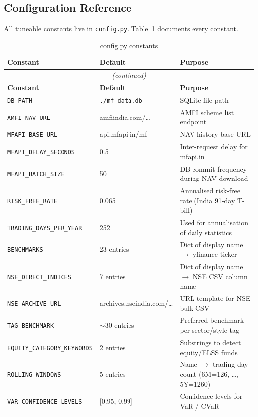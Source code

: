 \documentclass[12pt, a4paper]{article}
\begin{document}
\subsection{Configuration Reference}

All tuneable constants live in \texttt{config.py}.
Table~\ref{tab:config} documents every constant.

\begin{longtable}{@{}p{}p{}p{}@{}}
\caption{config.py constants}\label{tab:config}\\
\toprule
\textbf{Constant} & \textbf{Default} & \textbf{Purpose} \\
\midrule
\endfirsthead
\multicolumn{3}{c}{\textit{(continued)}}\\
\toprule
\textbf{Constant} & \textbf{Default} & \textbf{Purpose} \\
\midrule
\endhead
\texttt{DB\_PATH} & \texttt{./mf\_data.db} & SQLite file path \\[3pt]
\texttt{AMFI\_NAV\_URL} & amfiindia.com/\ldots & AMFI scheme list endpoint \\[3pt]
\texttt{MFAPI\_BASE\_URL} & api.mfapi.in/mf & NAV history base URL \\[3pt]
\texttt{MFAPI\_DELAY\_SECONDS} & 0.5 & Inter-request delay for mfapi.in \\[3pt]
\texttt{MFAPI\_BATCH\_SIZE} & 50 & DB commit frequency during NAV download \\[3pt]
\texttt{RISK\_FREE\_RATE} & 0.065 & Annualised risk-free rate (India 91-day T-bill) \\[3pt]
\texttt{TRADING\_DAYS\_PER\_YEAR} & 252 & Used for annualisation of daily statistics \\[3pt]
\texttt{BENCHMARKS} & 23 entries & Dict of display name $\to$ yfinance ticker \\[3pt]
\texttt{NSE\_DIRECT\_INDICES} & 7 entries & Dict of display name $\to$ NSE CSV column name \\[3pt]
\texttt{NSE\_ARCHIVE\_URL} & archives.nseindia.com/\ldots & URL template for NSE bulk CSV \\[3pt]
\texttt{TAG\_BENCHMARK} & $\sim$30 entries & Preferred benchmark per sector/style tag \\[3pt]
\texttt{EQUITY\_CATEGORY\_KEYWORDS} & 2 entries & Substrings to detect equity/ELSS funds \\[3pt]
\texttt{ROLLING\_WINDOWS} & 5 entries & Name $\to$ trading-day count (6M=126, \ldots, 5Y=1260) \\[3pt]
\texttt{VAR\_CONFIDENCE\_LEVELS} & [0.95, 0.99] & Confidence levels for VaR / CVaR \\
\bottomrule
\end{longtable}
\end{document}
